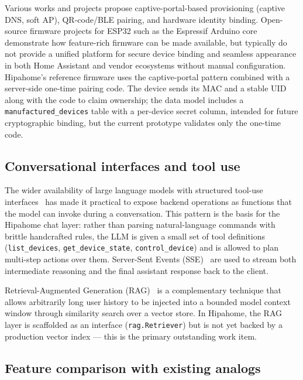 \documentclass[a4paper,12pt]{article}
\begin{document}
Various works and projects propose captive-portal-based provisioning (captive DNS, soft AP), QR-code/BLE pairing, and hardware identity binding. Open-source firmware projects for ESP32 such as the Espressif Arduino core~\cite{esp32-arduino} demonstrate how feature-rich firmware can be made available, but typically do not provide a unified platform for secure device binding and seamless appearance in both Home Assistant and vendor ecosystems without manual configuration. Hipahome's reference firmware uses the captive-portal pattern combined with a server-side one-time pairing code. The device sends its MAC and a stable UID along with the code to claim ownership; the data model includes a \verb|manufactured_devices| table with a per-device secret column, intended for future cryptographic binding, but the current prototype validates only the one-time code.

\subsection{Conversational interfaces and tool use}

The wider availability of large language models with structured tool-use interfaces~\cite{openai-tools, anthropic-tools, lewis-rag} has made it practical to expose backend operations as functions that the model can invoke during a conversation. This pattern is the basis for the Hipahome chat layer: rather than parsing natural-language commands with brittle handcrafted rules, the LLM is given a small set of tool definitions (\verb|list_devices|, \verb|get_device_state|, \verb|control_device|) and is allowed to plan multi-step actions over them. Server-Sent Events (SSE)~\cite{mdn-sse} are used to stream both intermediate reasoning and the final assistant response back to the client.

Retrieval-Augmented Generation (RAG)~\cite{lewis-rag} is a complementary technique that allows arbitrarily long user history to be injected into a bounded model context window through similarity search over a vector store. In Hipahome, the RAG layer is scaffolded as an interface (\verb|rag.Retriever|) but is not yet backed by a production vector index --- this is the primary outstanding work item.

\subsection{Feature comparison with existing analogs}
\label{sec:competitors}
\end{document}

